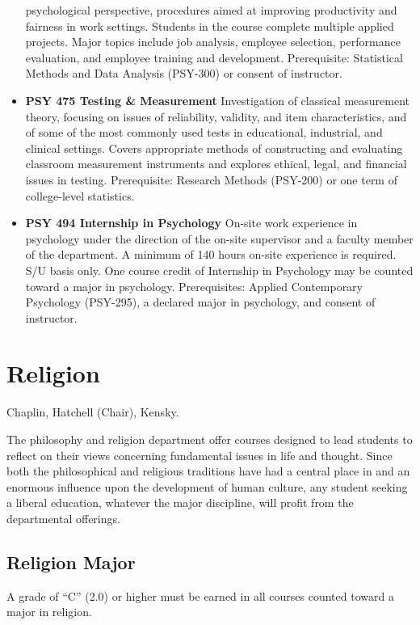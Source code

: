 \documentclass[
  letterpaper,
]{scrbook}
\begin{document}
\begin{itemize}
  psychological perspective, procedures aimed at improving productivity
  and fairness in work settings. Students in the course complete
  multiple applied projects. Major topics include job analysis, employee
  selection, performance evaluation, and employee training and
  development. Prerequisite: Statistical Methods and Data Analysis
  (PSY-300) or consent of instructor.
\item
  \textbf{PSY 475 Testing \& Measurement} Investigation of classical
  measurement theory, focusing on issues of reliability, validity, and
  item characteristics, and of some of the most commonly used tests in
  educational, industrial, and clinical settings. Covers appropriate
  methods of constructing and evaluating classroom measurement
  instruments and explores ethical, legal, and financial issues in
  testing. Prerequisite: Research Methods (PSY-200) or one term of
  college-level statistics.
\item
  \textbf{PSY 494 Internship in Psychology} On-site work experience in
  psychology under the direction of the on-site supervisor and a faculty
  member of the department. A minimum of 140 hours on-site experience is
  required. S/U basis only. One course credit of Internship in
  Psychology may be counted toward a major in psychology. Prerequisites:
  Applied Contemporary Psychology (PSY-295), a declared major in
  psychology, and consent of instructor.
\end{itemize}

\section{Religion}\label{sec-religion}

Chaplin, Hatchell (Chair), Kensky.

The philosophy and religion department offer courses designed to lead
students to reflect on their views concerning fundamental issues in life
and thought. Since both the philosophical and religious traditions have
had a central place in and an enormous influence upon the development of
human culture, any student seeking a liberal education, whatever the
major discipline, will profit from the departmental offerings.

\subsection{Religion Major}\label{religion-major}

A grade of ``C'' (2.0) or higher must be earned in all courses counted
toward a major in religion.
\end{document}
